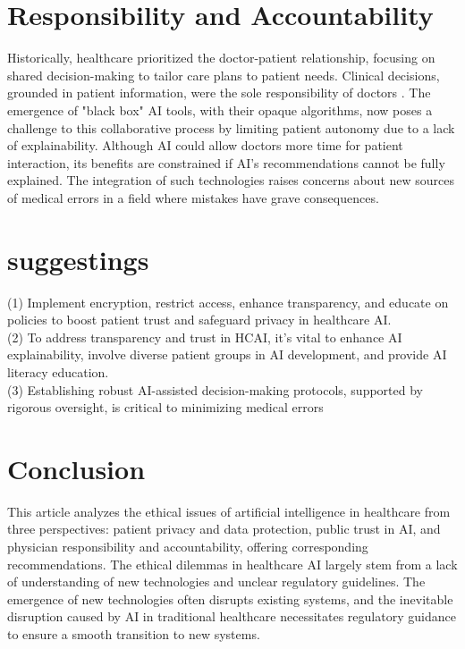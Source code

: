\documentclass[paper=a4, fontsize=11pt]{scrartcl} %
\numberwithin{equation}{section} %
\numberwithin{figure}{section} %
\numberwithin{table}{section} %
\begin{document}
\section{Responsibility and Accountability}
Historically, healthcare prioritized the doctor-patient relationship, focusing on shared decision-making 
to tailor care plans to patient needs. Clinical decisions, grounded in patient information, were the sole 
responsibility of doctors \cite{Smith2021ClinicalAIOpacity}. The emergence of "black box" AI tools, with their opaque algorithms, now poses 
a challenge to this collaborative process by limiting patient autonomy due to a lack of explainability. 
Although AI could allow doctors more time for patient interaction, its benefits are constrained if AI's 
recommendations cannot be fully explained. The integration of such technologies raises concerns about 
new sources of medical errors in a field where mistakes have grave consequences.


\section{suggestings}
(1) Implement encryption, restrict access, enhance transparency, and educate on policies to boost patient trust and safeguard privacy in healthcare AI.
\\(2) To address transparency and trust in HCAI, it's vital to enhance AI explainability, involve diverse patient groups in AI development, and provide AI literacy education.
\\(3) Establishing robust AI-assisted decision-making protocols, supported by rigorous oversight, is critical to minimizing medical errors

 



\section{Conclusion}
This article analyzes the ethical issues of artificial intelligence in healthcare from three 
perspectives: patient privacy and data protection, public trust in AI, and physician responsibility 
and accountability, offering corresponding recommendations. The ethical dilemmas in healthcare AI 
largely stem from a lack of understanding of new technologies and unclear regulatory guidelines. 
The emergence of new technologies often disrupts existing systems, and the inevitable disruption 
caused by AI in traditional healthcare necessitates regulatory guidance to ensure a smooth transition to new systems.
\end{document}
